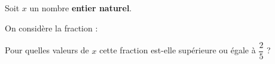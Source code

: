 \begin{exo}{}
	Soit $x$ un nombre \textbf{entier naturel}.

	On considère la fraction : 

	Pour quelles valeurs de $x$ cette fraction est-elle supérieure ou égale à $\dfrac{2}{5}$ ?
\end{exo}
